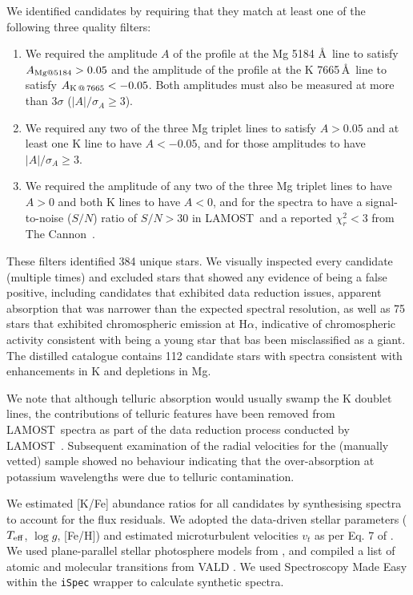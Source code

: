 \documentclass[a4paper,fleqn,usenatbib]{mnras}
\newcommand{\project}[1]{#1}
\newcommand{\lamost}{\project{LAMOST}}
\newcommand{\tc}{\project{The Cannon}}
\begin{document}
We identified candidates by requiring that they match at least one of the following three quality filters:
\begin{enumerate}
\item We required the amplitude $A$ of the profile at the Mg 5184 \AA \ line to satisfy $A_{{\rm Mg} @ 5184} > 0.05$ and the amplitude of the profile at the K 7665\,\AA\ line to satisfy $A_{{\rm K}\,@\,7665} < -0.05$. Both amplitudes must also be measured at more than $3\sigma$ ($|A|/\sigma_{A} \geq 3$).
\item We required any two of the three Mg triplet lines to satisfy $A > 0.05$ and at least one K line to have $A < -0.05$, and for those amplitudes to have $|A|/\sigma_{A} \geq 3$.
\item We required the amplitude of any two of the three Mg triplet lines to have $A > 0$ and both K lines to have $A < 0$, and for the spectra to have a signal-to-noise ($S/N$) ratio of $S/N > 30$ in \lamost\ and a reported $\chi_{r}^2 < 3$ from \tc\ \citep{ness2016,ho2017}.
\end{enumerate} 
 
These filters identified 384 unique stars. We visually inspected every candidate (multiple times) and excluded stars that showed any evidence of being a false positive, including candidates that exhibited data reduction issues, apparent absorption that was narrower than the expected spectral resolution, as well as 75 stars that exhibited chromospheric emission at H$\alpha$, indicative of chromospheric activity consistent with being a young star that bas been misclassified as a giant. The distilled catalogue contains 112 candidate stars with spectra consistent with enhancements in K and depletions in Mg.

We note that although telluric absorption would usually swamp the K doublet lines, the contributions of telluric features have been removed from \lamost\ spectra as part of the data reduction process conducted by \lamost\ \citep{luo2016vizier}. Subsequent examination of the radial velocities for the (manually vetted) sample showed no behaviour indicating that the over-absorption at potassium wavelengths were due to telluric contamination.

We estimated [K/Fe] abundance ratios for all candidates by synthesising spectra to account for the flux residuals. We adopted the data-driven stellar parameters ($T_{\rm eff}$, $\log{g}$, [Fe/H]) and estimated microturbulent velocities $v_t$ as per Eq. 7 of \citet{kirby2008}. We used plane-parallel stellar photosphere models from \citet{marcs}, and compiled a list of atomic and molecular transitions from VALD \citep{vald}. We used Spectroscopy Made Easy \citep{sme} within the \texttt{iSpec} wrapper \citep{ispec} to calculate synthetic spectra.
\end{document}
